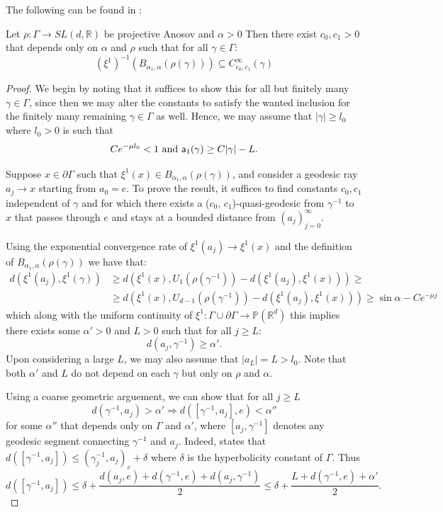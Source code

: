 \documentclass{report}
\begin{document}
The following can be found in \cite[Proposition 3.3]{pozzetti_anosov_2023}:
\begin{proposition}\label{prop:shadows}
    Let $\rho: \Gamma \to SL(d, \mathbb R)$ be projective Anosov and $\alpha > 0$
    Then there exist $c_0, c_1 > 0$ that depends only on $\alpha$ and $\rho$ such that for all $\gamma \in \Gamma$:
    \[
        (\xi^1)^{-1}(B_{\alpha_1, \alpha}(\rho(\gamma))) \subseteq C_{c_0,c_1}^\infty(\gamma)
    \]
\end{proposition}
\begin{proof}
    We begin by noting that it suffices to show this for all but finitely many $\gamma \in \Gamma$, since then we may alter the constants to satisfy the wanted inclusion for the finitely many remaining $\gamma \in \Gamma$ as well. 
    Hence, we may assume that $|\gamma| \geq l_0$ where $l_0 > 0$ is such that 
    \[
        Ce^{-\mu l_0} < 1 \text{ and } {\sf a}_1(\gamma) \geq C|\gamma| - L.
    \]

    Suppose $x \in \partial \Gamma$ such that $\xi^1(x) \in B_{\alpha_1, \alpha}(\rho(\gamma))$, and consider a geodesic ray $a_j \to x$ starting from $a_0 = e$.
    To prove the result, it suffices to find constants $c_0, c_1$ independent of $\gamma$ and for which there exists a ($c_0$, $c_1$)-quasi-geodesic from $\gamma^{-1}$ to $x$ that passes through $e$ and stays at a bounded distance from $(a_j)_{j=0}^\infty$.

    Using the exponential convergence rate of $\xi^1(a_j) \to \xi^1(x)$ and the definition of $B_{\alpha_1, \alpha}(\rho(\gamma))$ we have that:
    \begin{align*}
        d(\xi^1(a_j), \xi^1(\gamma)) &\geq
        d(\xi^1(x), U_1(\rho(\gamma^{-1}))-d(\xi^1(a_j), \xi^1(x)))
        \geq \\
        &\geq
        d(\xi^1(x), U_{d-1}(\rho(\gamma^{-1}))-d(\xi^1(a_j), \xi^1(x)))
        \geq
        \sin \alpha - Ce^{-\mu j}
    \end{align*}
    which along with the uniform continuity of $\xi^1: \Gamma \cup \partial \Gamma \to \mathbb P(\mathbb R^d)$ this implies there exists some $\alpha' > 0$ and $L>0$ such that for all $j\geq L$:
    \[
        d(a_j, \gamma^{-1}) \geq \alpha'.
    \]
    Upon considering a large $L$, we may also assume that $|a_L| = L > l_0$. Note that both $\alpha'$ and $L$ do not depend on each $\gamma$ but only on $\rho$ and $\alpha$.

    Using a coarse geometric arguement, we can show that for all $j \geq L$
    \[
        d(\gamma^{-1}, a_j) > \alpha' \Rightarrow
        d([\gamma^{-1}, a_j], e) < \alpha''
    \]
    for some $\alpha''$ that depends only on $\Gamma$ and $\alpha'$, where $[a_j, \gamma^{-1}]$ denotes any geodesic segment connecting $\gamma^{-1}$ and $a_j$.
    Indeed, \cite[Lemme 2.17]{ghys2013groupes} states that 
    $d([\gamma^{-1}, a_j]) \leq (\gamma_j^{-1}, a_j)_e + \delta$
    where $\delta$ is the hyperbolicity constant of $\Gamma$.
    Thus
    \[
        d([\gamma^{-1}, a_j]) \leq \delta + \frac{d(a_j, e) + d(\gamma^{-1},e) + d(a_j, \gamma^{-1})}{2} \leq
        \delta + \frac{L + d(\gamma^{-1}, e) + \alpha'}{2}.
    \]


\end{proof}
\end{document}
